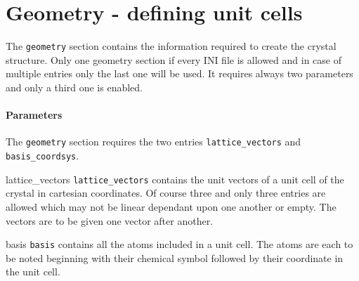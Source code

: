 \section{Geometry - defining unit cells} 
The \lstinline{geometry} section contains the information required to create the crystal structure. Only one geometry section if every INI file is allowed and in case of multiple entries only the last one will be used. It requires always two parameters and only a third one is enabled.

\paragraph{Parameters}
The \lstinline{geometry} section requires the two entries \lstinline{lattice_vectors} and \lstinline{basis_coordsys}.
\begin{description}
 \item{lattice\_vectors} \lstinline{lattice_vectors} contains the unit vectors of a unit cell of the crystal in cartesian coordinates. Of course three and only three entries are allowed which may not be linear dependant upon one another or empty. The vectors are to be given one vector after another.
 \item{basis} \lstinline{basis} contains all the atoms included in a unit cell. The atoms are each to be noted beginning with their chemical symbol followed by their coordinate in the unit cell.
\end{description}


